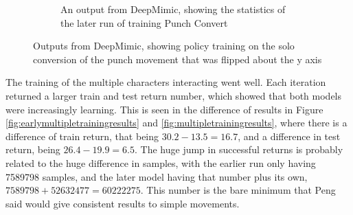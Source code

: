 \documentclass{l4proj}
\begin{document}
\begin{figure}
\begin{subfigure}[b]{0.45\textwidth}
    \caption{An output from DeepMimic, showing the statistics of the later run of training Punch Convert}
    \label{fig:punchconvertoutput2}
  \end{subfigure}
  \caption{Outputs from DeepMimic, showing policy training on the solo conversion of the punch movement that was flipped about the y axis}
  \label{fig:punchconvertoutput}
\end{figure}

The training of the multiple characters interacting went well. Each iteration returned a larger train and test return number, which showed that both models were increasingly learning. This is seen in the difference of results in Figure \ref{fig:earlymultipletrainingresults} and \ref{fig:multipletrainingresults}, where there is a difference of train return, that being $30.2-13.5=16.7$, and a difference in test return, being $26.4-19.9=6.5$. The huge jump in successful returns is probably related to the huge difference in samples, with the earlier run only having 7589798 samples, and the later model having that number plus its own, $7589798+52632477=60222275$. This number is the bare minimum that Peng said would give consistent results to simple movements.
\end{document}
